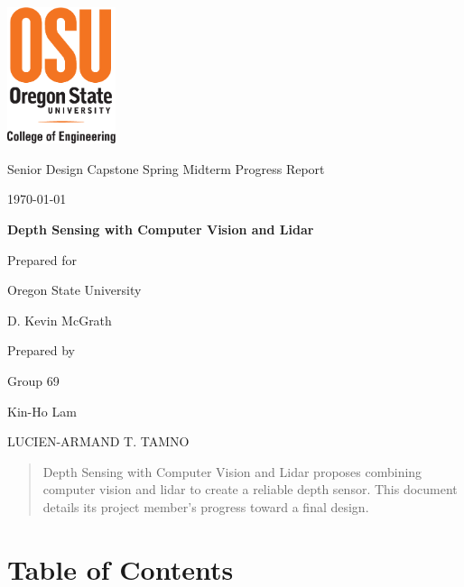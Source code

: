 \documentclass[onecolumn, draftclsnofoot,10pt, compsoc]{IEEEtran}
\def \CapstoneTeamName{			}
\def \CapstoneTeamNumber{		69}
\def \GroupMemberOne{			Kin-Ho Lam}
\def \GroupMemberTwo{LUCIEN-ARMAND T. TAMNO}
\def \CapstoneProjectName{		Depth Sensing with Computer Vision and Lidar}
\def \CapstoneSponsorCompany{	Oregon State University}
\def \CapstoneSponsorPerson{	D. Kevin McGrath}
\def \DocType{
	Spring Midterm Progress Report
}
\newcommand{\NameSigPair}[1]{\par
	\makebox[2.75in][r]{#1} \hfil 	\makebox[3.25in]{\makebox[2.25in]{\hrulefill} \hfill		\makebox[.75in]{\hrulefill}}
	\par\vspace{-12pt} \textit{\tiny\noindent
		\makebox[2.75in]{} \hfil		\makebox[3.25in]{\makebox[2.25in][r]{Signature} \hfill	\makebox[.75in][r]{Date}}}}
\renewcommand{\NameSigPair}[1]{#1}
\begin{document}
	\begin{titlepage}
		\begin{singlespace}
			\centering
			\includegraphics[height=4cm,natwidth=345,natheight=435]{images/osu_logo.png}
			\hfill 
			\par\vspace{.2in}
			\centering
			\scshape{
				\huge Senior Design Capstone \DocType \par
				{\large\today}\par
				\vspace{.5in}
				\textbf{\Huge\CapstoneProjectName}\par
				\vfill
				{\large Prepared for}\par
				\Huge \CapstoneSponsorCompany\par
				\vspace{5pt}
				{\Large\NameSigPair{\CapstoneSponsorPerson}\par}
				{\large Prepared by }\par
				Group\CapstoneTeamNumber\par
				\CapstoneTeamName\par 
				\vspace{5pt}
				{\large
					\NameSigPair{\GroupMemberOne}\par
					\NameSigPair{\GroupMemberTwo}\par
				}
				\vspace{20pt}
			}
			\begin{abstract}  
 				Depth Sensing with Computer Vision and Lidar proposes combining computer vision and lidar to create a reliable depth sensor.
				This document details its project member's progress toward a final design.
			\end{abstract}     
		\end{singlespace}
	\end{titlepage}
\section{Table of Contents}
\tableofcontents


\clearpage
\end{document}
